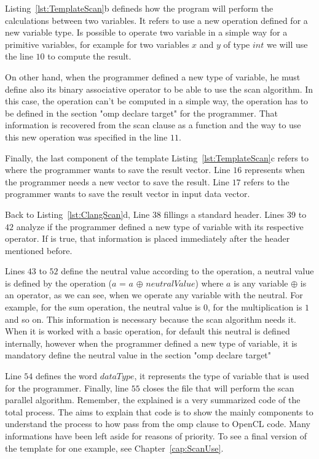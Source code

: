 \documentclass[Ingles]{ic-tese-v1}
\newcommand{\rcap}[1]{Chapter~\ref{cap:#1}}
\newcommand{\rlst}[1]{Listing~\ref{lst:#1}}
\begin{document}
\rlst{TemplateScan}{b} defineds how the program will perform the calculations
between two variables. It refers to use a new operation defined for a new
variable type. Is possible to operate two variable in a simple way for a
primitive variables, for example for two variables $x$ and $y$ of type $int$ we
will use the line $10$ to compute the result.

On other hand, when the programmer defined a new type of variable, he must
define also its binary associative operator to be able to use the scan
algorithm. In this case, the operation can't be computed in a simple way, the
operation has to be defined in the section "omp declare target" for the
programmer. That information is recovered from the scan clause as a function
and the way to use this new operation was specified in the line $11$.

Finally, the last component of the template \rlst{TemplateScan}{c} refers to
where the programmer wants to save the result vector. Line $16$ represents when
the programmer needs a new vector to save the result. Line $17$ refers to the
programmer wants to save the result vector in input data vector.

Back to \rlst{ClangScan}{d}, Line $38$ fillings a standard header. Lines $39$
to $42$ analyze if the programmer defined a new type of variable with its
respective operator. If is true, that information is placed immediately after
the header mentioned before.

Lines $43$ to $52$ define the neutral value according to the operation, a
neutral value is defined by the operation ($a$ = $a$ $\oplus$ $neutralValue$)
where $a$ is any variable $\oplus$ is an operator, as we can see, when we
operate any variable with the neutral. For example, for the sum operation, the
neutral value is $0$, for the multiplication is $1$ and so on. This information
is necessary because the scan algorithm needs it. When it is worked with a
basic operation, for default this neutral is defined internally, however when
the programmer defined a new type of variable, it is mandatory define the
neutral value in the section "omp declare target"

Line $54$ defines the word $dataType$, it represents the type of variable that
is used for the programmer. Finally, line $55$ closes the file that will
perform the scan parallel algorithm. Remember, the explained is a very
summarized code of the total process. The aims to explain that code is to show
the mainly components to understand the process to how pass from the omp clause
to OpenCL code. Many informations have been left aside for reasons of priority.
To see a final version of the template for one example, see \rcap{ScanUse}.
\end{document}
